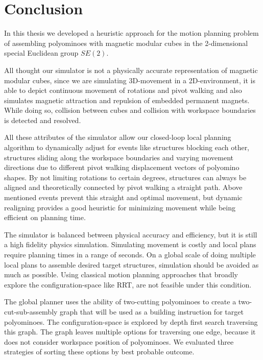 \chapter{Conclusion}
\label{chap:conclusion}

In this thesis we developed a heuristic approach for the motion planning problem of assembling polyominoes with magnetic modular cubes \cite{Bhattacharjee2022} in the 2-dimensional special Euclidean group $\textit{SE}(2)$.

All thought our simulator is not a physically accurate representation of magnetic modular cubes, since we are simulating 3D-movement in a 2D-environment, it is able to depict continuous movement of rotations and pivot walking and also simulates magnetic attraction and repulsion of embedded permanent magnets.
While doing so, collision between cubes and collision with workspace boundaries is detected and resolved.

All these attributes of the simulator allow our closed-loop local planning algorithm to dynamically adjust for events like structures blocking each other, structures sliding along the workspace boundaries and varying movement directions due to different pivot walking displacement vectors of polyomino shapes.
By not limiting rotations to certain degrees, structures can always be aligned and theoretically connected by pivot walking a straight path.
Above mentioned events prevent this straight and optimal movement, but dynamic realigning provides a good heuristic for minimizing movement while being efficient on planning time.

The simulator is balanced between physical accuracy and efficiency, but it is still a high fidelity physics simulation.
Simulating movement is costly and local plans require planning times in a range of seconds.
On a global scale of doing multiple local plans to assemble desired target structures, simulation should be avoided as much as possible.
Using classical motion planning approaches that broadly explore the configuration-space like RRT, are not feasible under this condition.

The global planner uses the ability of two-cutting polyominoes to create a two-cut-sub-assembly graph that will be used as a building instruction for target polyominoes.
The configuration-space is explored by depth first search traversing this graph.
The graph leaves multiple options for traversing one edge, because it does not consider workspace position of polyominoes. 
We evaluated three strategies of sorting these options by best probable outcome.



